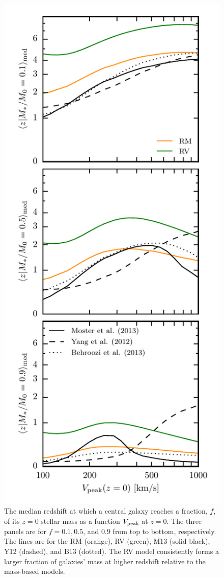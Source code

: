 \documentclass[useAMS,fleqn,usenatbib]{mnras}
\begin{document}
\begin{figure}
    \includegraphics[width=\columnwidth]{figures/stellar_mass_zform.pdf}
    \caption{The median redshift at which a central galaxy reaches a fraction, $f$, of its $z=0$ stellar mass as a function $V_{\rm peak}$ at $z=0$. The three panels are for $f=0.1, 0.5$, and $0.9$ from top to bottom, respectively.  The lines are for the RM (orange), RV (green), M13 (solid black), Y12 (dashed), and B13 (dotted).  The RV model consistently forms a larger fraction of galaxies' mass at higher redshift relative to the mass-based models.}
    \label{fig:mstar_zform}
\end{figure}
\end{document}
